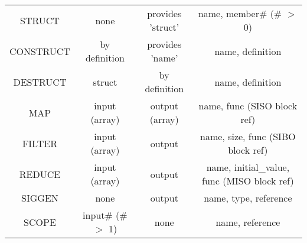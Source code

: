 \begin{longtable}[c]{ |c|c|c|c| }
    STRUCT & none & provides 'struct' & name, member\# (\# $>$ 0) \\
    CONSTRUCT & by definition & provides 'name' & name, definition \\
    DESTRUCT & struct & by definition & name, definition \\
    \hline
    MAP & input (array) & output (array) & name, func (SISO block ref) \\
    FILTER & input (array) & output & name, size, func (SIBO block ref) \\
    REDUCE & input (array) & output & name, initial\_value, func (MISO block ref) \\
    \hline
    SIGGEN & none & output & name, type, reference \\
    SCOPE & input\# (\# $>$ 1) & none & name, reference \\
\end{longtable}
